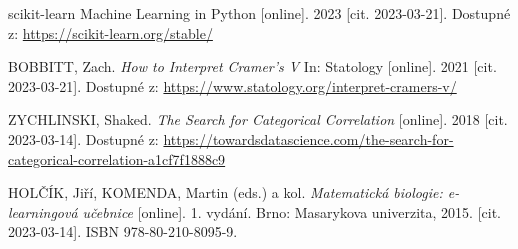 \begin{thebibliography}{1}
scikit-learn Machine Learning in Python [online]. 2023 [cit. 2023-03-21]. Dostupné z: \url{https://scikit-learn.org/stable/}

BOBBITT, Zach. \textit{How to Interpret Cramer’s V} In: Statology [online]. 2021 [cit. 2023-03-21]. Dostupné z: \url{https://www.statology.org/interpret-cramers-v/}

ZYCHLINSKI, Shaked. \textit{The Search for Categorical Correlation} [online]. 2018 [cit. 2023-03-14]. Dostupné z: \url{https://towardsdatascience.com/the-search-for-categorical-correlation-a1cf7f1888c9}

HOLČÍK, Jiří, KOMENDA, Martin (eds.) a kol. \textit{Matematická biologie: e-learningová učebnice} [online]. 
1. vydání. Brno: Masarykova univerzita, 2015. [cit. 2023-03-14]. ISBN 978-80-210-8095-9.

\end{thebibliography}
	
% 
	
	